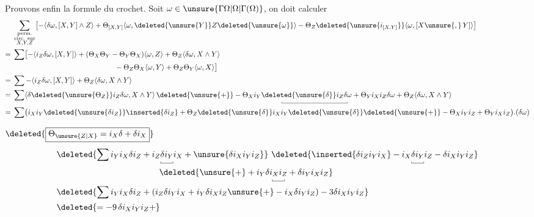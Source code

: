 Prouvons enfin la formule du crochet. Soit $\omega\in\unsure{\Gamma\Omega|\Omega|\Gamma(\Omega)}$, on doit  calculer
\[
\begin{aligned}
&\sum_{\substack{\text{perm.}\\\text{circ. sur}\\X,Y,Z}}
\bigl[-\langle\delta\omega,[X,Y]\wedge Z\rangle+\Theta_{[X,Y]}\langle\omega,\deleted{\unsure{Y}}Z\deleted{\unsure{\omega}}\rangle-\Theta_Z\deleted{\unsure{i_{[X,Y]}}}\langle\omega,[X\unsure{,}\,Y]\rangle\bigr]\\
={}&\sum\bigl[-\langle i_Z\delta\omega,[X,Y]\rangle+(\Theta_X\Theta_Y-\Theta_Y\Theta_X)\langle\omega,Z\rangle+\Theta_Z\langle\delta\omega,X\wedge Y\rangle\\
&\hspace{14em}-\Theta_Z\Theta_X\langle\omega,Y\rangle+\Theta_Z\Theta_Y\langle\omega,X\rangle\bigr]\\
={}&\sum-\langle i_Z\delta\omega,[X,Y]\rangle+\Theta_Z\langle\delta\omega,X\wedge Y\rangle\\
={}&\sum\langle\delta\deleted{\unsure{\Theta_Z}}i_Z\delta\omega,X\wedge Y\rangle\,
\deleted{\unsure{+}}-\underset{\smash{\rule{.35pt}{2pt}\rule{9em}{.35pt}\rule{.35pt}{2pt}}}{\Theta_X i_Y\deleted{\unsure{\delta}}i_Z\delta\omega+\Theta_Y i_X i_Z}\delta\omega+\Theta_Z\langle\delta\omega,X\wedge Y\rangle\\
={}&\sum\bigl(i_X i_Y\deleted{\unsure{\delta i_Z}}\inserted{\delta i_Z}+\Theta_Z\deleted{\unsure{\delta}}i_X i_Y\deleted{\unsure{\delta}}\deleted{\unsure{+}}-\Theta_X i_Y i_Z+\Theta_Y i_X i_Z\bigr).(\delta\omega)
\end{aligned}
\]

 $\deleted{\boxed{\Theta_{\unsure{Z|X}}=i_X\delta+\delta i_X}}$  
\[
\begin{aligned}
&\deleted{\sum i_Y i_X\delta i_Z+i_Z\underset{\smash{\rule{.35pt}{2pt}\rule{1.4em}{.35pt}\rule{.35pt}{2pt}}}{\delta i_Y}i_X+\unsure{\delta i_X i_Y i_Z}}\
\deleted{\inserted{\delta i_Z i_Y i_X}-i_X\underset{\smash{\rule{.35pt}{2pt}\rule{1.4em}{.35pt}\rule{.35pt}{2pt}}}{\delta i_Y}i_Z-\delta i_X i_Y i_Z}\\
&\hspace{12em}\deleted{\unsure{+}+i_Y\delta\underset{\smash{\rule{.35pt}{2pt}\rule{1.4em}{.35pt}\rule{.35pt}{2pt}}}{i_X i_Z}+\delta i_Y i_X i_Z}\\
&\deleted{\sum i_Y i_X\delta i_Z+(i_Z\delta i_Y i_X+i_Y\delta i_X i_Z\unsure{+}-i_X\delta i_Y i_Z)-3\delta i_X i_Y i_Z}\\
&\deleted{=-9\,\delta i_X i_Y i_Z+}
\end{aligned}
\]

